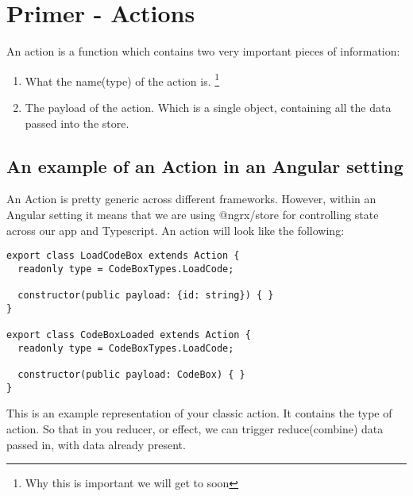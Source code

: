 \chapter{ Primer - Actions }
An action is a function which contains two very important pieces of information:
\begin{enumerate}
  \item What the name(type) of the action is. \footnote{Why this is important we
  will get to soon}
  \item The payload of the action. Which is a single object, containing all the data passed into the store.
\end{enumerate}

\section{An example of an Action in an Angular setting}
An Action is pretty generic across different frameworks.  However, within an Angular setting it means that we are using @ngrx/store for controlling state across our app and Typescript. An action will look like the following:
\begin{lstlisting}
export class LoadCodeBox extends Action {
  readonly type = CodeBoxTypes.LoadCode;

  constructor(public payload: {id: string}) { }
}

export class CodeBoxLoaded extends Action {
  readonly type = CodeBoxTypes.LoadCode;

  constructor(public payload: CodeBox) { }
}
\end{lstlisting}

This is an example representation of your classic action. It contains the type of action. So that in you reducer, or effect, we can trigger reduce(combine) data passed in, with data already present.


